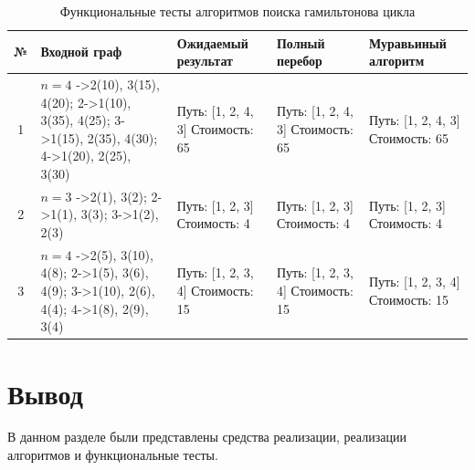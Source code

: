 \begin{table}[H]
	\centering
	\caption{Функциональные тесты алгоритмов поиска гамильтонова цикла}
	\label{tab:functional-tests}
	\renewcommand{\arraystretch}{1.25}
	\begin{tabular}{|c|p{4.2cm}|p{3cm}|p{3cm}|p{3cm}|}
		\hline
		\textbf{№} &
		\textbf{Входной граф} &
		\textbf{Ожидаемый результат} &
		\textbf{Полный перебор} &
		\textbf{Муравьиный алгоритм} \\ \hline
		
		1 &
		$n=4$ \newline
		1->2(10), 3(15), 4(20); 2->1(10), 3(35), 4(25); 3->1(15), 2(35), 4(30); 4->1(20), 2(25), 3(30)
		&
		Путь: [1, 2, 4, 3] \newline Стоимость: 65
		&
		Путь: [1, 2, 4, 3] \newline Стоимость: 65
		&
		Путь: [1, 2, 4, 3] \newline Стоимость: 65
		\\ \hline
		
		2 &
		$n=3$ \newline
		1->2(1), 3(2); 2->1(1), 3(3); 3->1(2), 2(3)
		&
		Путь: [1, 2, 3] \newline Стоимость: 4
		&
		Путь: [1, 2, 3] \newline Стоимость: 4
		&
		Путь: [1, 2, 3] \newline Стоимость: 4
		\\ \hline
		
		3 &
		$n=4$ \newline
		1->2(5), 3(10), 4(8); 2->1(5), 3(6), 4(9); 3->1(10), 2(6), 4(4); 4->1(8), 2(9), 3(4)
		&
		Путь: [1, 2, 3, 4] \newline Стоимость: 15
		&
		Путь: [1, 2, 3, 4] \newline Стоимость: 15
		&
		Путь: [1, 2, 3, 4] \newline Стоимость: 15
		\\ \hline
		
	\end{tabular}
\end{table}






\section*{Вывод}
В данном разделе были представлены средства реализации, реализации алгоритмов и функциональные тесты.


